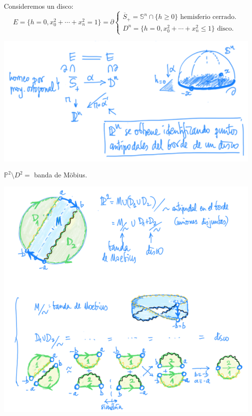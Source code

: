 \begin{prop}
Consideremos un disco:
\[
    E = \{h = 0, x_0^2 + \cdots + x_n^2 = 1\} = \partial \begin{cases}
        \overline{S}_+ = \mathbb{S}^n \cap \{h \ge 0\} \text{ hemisferio cerrado.} \\
        D^n = \{h = 0, x_0^2 + \cdots + x_n^2 \le 1\} \text{ disco.} 
    \end{cases} 
\]
\begin{center}
    \includegraphics[scale=0.3]{images/cociente_disco} 
\end{center}
\end{prop}

\begin{ej}
$\mathbb{P}^{2} \setminus D^2 = $ banda de Möbius.
\begin{center}
    \includegraphics[scale=0.3]{images/banda_moebius} 
\end{center}
\end{ej}

